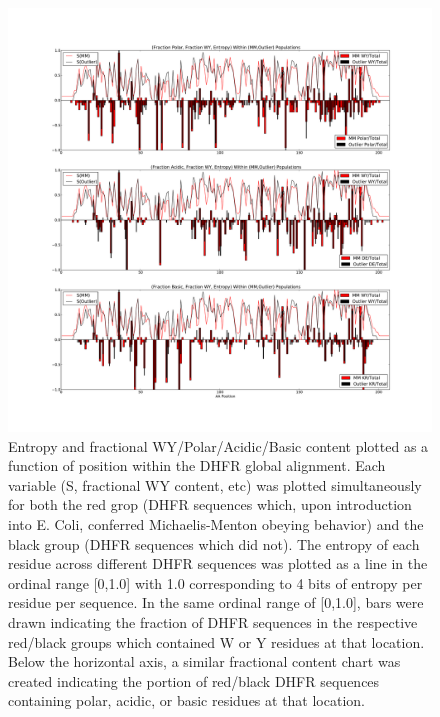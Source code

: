\documentclass[a4paper,11pt]{article}
\begin{document}
\listoffigures


\begin{figure}[h]
\centerline{\includegraphics[width=8in]{AA+S.pdf}}
\caption[$S_{\rm red}$, $S_{\rm black}$, WY/Polar/Acidic/Basic Content vs Residue \#]{Entropy and fractional WY/Polar/Acidic/Basic content plotted as a function of position within the DHFR global alignment. Each variable (S, fractional WY content, etc) was plotted simultaneously for both the red grop (DHFR sequences which, upon introduction into E. Coli, conferred Michaelis-Menton obeying behavior) and the black group (DHFR sequences which did not). The entropy of each residue across different DHFR sequences was plotted as a line in the ordinal range [0,1.0] with 1.0 corresponding to 4 bits of entropy per residue per sequence. In the same ordinal range of [0,1.0], bars were drawn indicating the fraction of DHFR sequences in the respective red/black groups which contained W or Y residues at that location. Below the horizontal axis, a similar fractional content chart was created indicating the portion of red/black DHFR sequences containing polar, acidic, or basic residues at that location.}
\end{figure}
\end{document}
